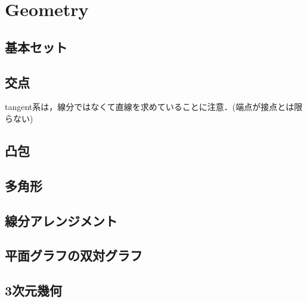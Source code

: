\section{Geometry}

\subsection{基本セット}


\subsection{交点}
tangent系は，線分ではなくて直線を求めていることに注意．(端点が接点とは限らない)


\subsection{凸包}


\subsection{多角形}


\subsection{線分アレンジメント}


\subsection{平面グラフの双対グラフ}


\subsection{3次元幾何}

